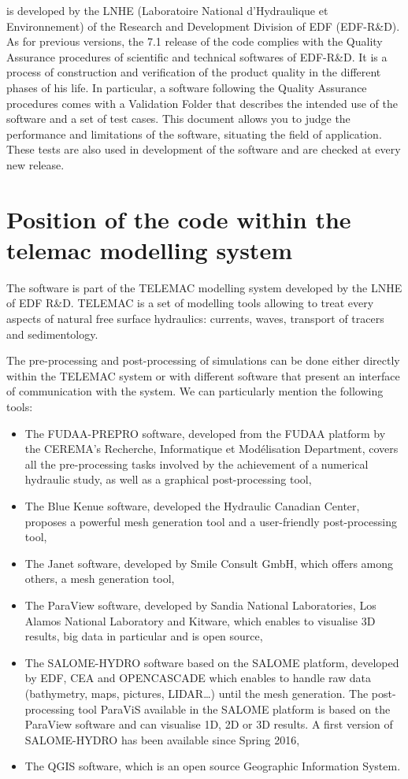  is developed by the LNHE (Laboratoire National d'Hydraulique et
Environnement) of the Research and Development Division of EDF (EDF-R\&D). As
for previous versions, the 7.1 release of the code complies with the Quality
Assurance procedures of scientific and technical softwares of EDF-R\&D. It is a
process of construction and verification of the product quality in the
different phases of his life. In particular, a software following the Quality
Assurance procedures comes with a Validation Folder that describes the intended
use of the software and a set of test cases. This document allows you to judge
the performance and limitations of the software, situating the field of
application. These tests are also used in development of the software and are
checked at every new release.

\section{Position of the  code within the telemac modelling system}

The  software is part of the TELEMAC modelling system developed by
the LNHE of EDF R\&D. TELEMAC is a set of modelling tools allowing to treat
every aspects of natural free surface hydraulics: currents, waves, transport of
tracers and sedimentology.

The pre-processing and post-processing of simulations can be done either
directly within the TELEMAC system or with different software that present an
interface of communication with the system. We can particularly mention the
following tools:

\begin{itemize}
\item The FUDAA-PREPRO software, developed from the FUDAA platform
by the CEREMA's Recherche, Informatique et Modélisation Department, covers all
the pre-processing tasks involved by the achievement of a numerical hydraulic
study, as well as a graphical post-processing tool,
\item The Blue Kenue software, developed the Hydraulic Canadian
Center, proposes a powerful mesh generation tool and a user-friendly
post-processing tool,
\item The Janet software, developed by Smile Consult GmbH, which offers among
others, a mesh generation tool,
\item The ParaView software, developed by Sandia National Laboratories, Los
Alamos National Laboratory and Kitware, which enables to visualise 3D results,
big data in particular and is open source,
\item The SALOME-HYDRO software based on the SALOME platform, developed by EDF,
CEA and OPENCASCADE which enables to handle raw data (bathymetry, maps,
pictures, LIDAR\ldots) until the mesh generation.
The post-processing tool ParaViS available in the SALOME platform is based on
the ParaView software and can visualise 1D, 2D or 3D results.
A first version of SALOME-HYDRO has been available since Spring 2016,
\item The QGIS software, which is an open source Geographic Information System.
\end{itemize}


